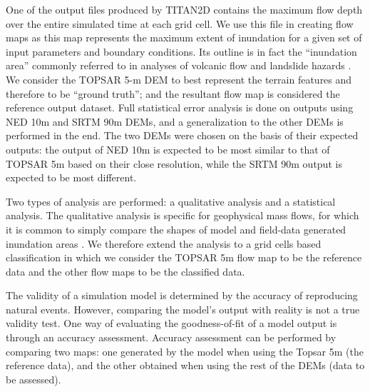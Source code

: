 \documentclass[12pt,letterpaper]{article}
\begin{document}
One of the output files produced by TITAN2D contains the maximum flow
depth over the entire simulated time at each grid cell.  We use this
file in creating flow maps as this map represents the maximum extent
of inundation for a given set of input parameters and boundary
conditions.  Its outline is in fact the ``inundation area'' commonly
referred to in analyses of volcanic flow and landslide hazards \citep{Proctor2010}.  We
consider the TOPSAR 5-m DEM to best represent the terrain features and
therefore to be ``ground truth''; and the resultant flow map is
considered the reference output dataset. Full statistical error
analysis is done on outputs using NED 10m and SRTM 90m DEMs, and a
generalization to the other DEMs is performed in the end. The two DEMs
were chosen on the basis of their expected outputs: the output of NED
10m is expected to be most similar to that of TOPSAR 5m based on 
their close resolution, while the
SRTM 90m output is expected to be most different.

Two types of analysis are performed: a qualitative analysis and a
statistical analysis. The qualitative analysis is specific for
geophysical mass flows, for which it is common to simply compare the
shapes of model and field-data generated inundation areas
\citep{Takahashi2000}. We therefore extend the analysis to a grid
cells based classification in which we consider the TOPSAR 5m flow map
to be the reference data and the other flow maps to be the classified
data.  

The validity of a simulation model is determined by
  the accuracy of reproducing natural events. However, comparing the model's
  output with reality is not a true validity test. One way of
  evaluating the goodness-of-fit of a model output is through an
  accuracy assessment. Accuracy assessment can be performed by
  comparing two maps: one generated by the model when using
  the Topsar 5m (the reference data), and the other obtained when
  using the rest of the DEMs (data to be assessed).
  
\end{document}
